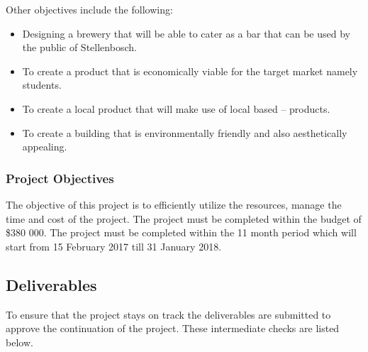 \noindent
Other objectives include the following:
\begin{itemize}
\item Designing a brewery that will be able to cater as a bar that can be used by the public of Stellenbosch.
\item To create a product that is economically viable for the target market namely students.
\item To create a local product that will make use of local based – products.
\item To create a building that is environmentally friendly and also aesthetically appealing.
\end{itemize}

\subsubsection{Project Objectives}

The objective of this project is to efficiently utilize the resources, manage the time and cost of the project.
The project must be completed within the budget of \$380 000.
The project must be completed within the 11 month period which will start from 15 February 2017 till 31 January 2018.

\subsection{Deliverables}

To ensure that the project stays on track the deliverables are submitted to approve the continuation of the project. These intermediate checks are listed below.

